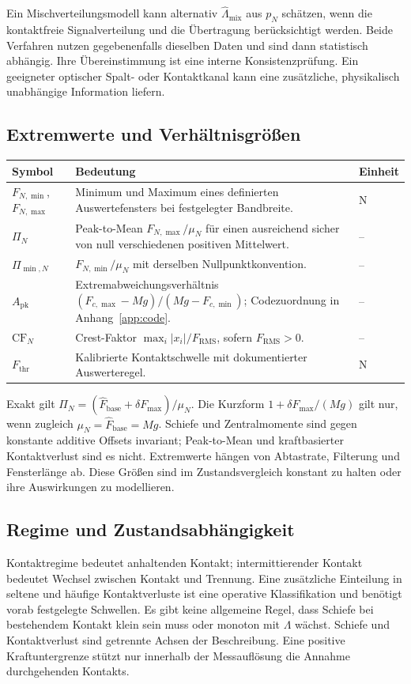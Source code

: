 \documentclass[11pt,a4paper]{article}
\makeatletter
\newenvironment{symtab}{\begin{longtable}{@{}L{.22\textwidth}L{.62\textwidth}L{.12\textwidth}@{}}\toprule\textbf{Symbol}&\textbf{Bedeutung}&\textbf{Einheit}\\\midrule\endhead}{\bottomrule\end{longtable}}
\makeatother
\begin{document}
Ein Mischverteilungsmodell kann alternativ $\hat\Lambda_{\mathrm{mix}}$ aus $p_N$ schätzen, wenn die kontaktfreie Signalverteilung und die Übertragung berücksichtigt werden. Beide Verfahren nutzen gegebenenfalls dieselben Daten und sind dann statistisch abhängig. Ihre Übereinstimmung ist eine interne Konsistenzprüfung. Ein geeigneter optischer Spalt- oder Kontaktkanal kann eine zusätzliche, physikalisch unabhängige Information liefern.

\subsection{Extremwerte und Verhältnisgrößen}
\begin{symtab}
$F_{N,\min}$, $F_{N,\max}$&Minimum und Maximum eines definierten Auswertefensters bei festgelegter Bandbreite.&N\\
$\Pi_N$&Peak-to-Mean $F_{N,\max}/\mu_N$ für einen ausreichend sicher von null verschiedenen positiven Mittelwert.&--\\
$\Pi_{\min,N}$&$F_{N,\min}/\mu_N$ mit derselben Nullpunktkonvention.&--\\
$A_{\mathrm{pk}}$&Extremabweichungsverhältnis $(F_{c,\max}-Mg)/(Mg-F_{c,\min})$; Codezuordnung in Anhang~\ref{app:code}.&--\\
$\mathrm{CF}_N$&Crest-Faktor $\max_i|x_i|/F_{\mathrm{RMS}}$, sofern $F_{\mathrm{RMS}}>0$.&--\\
$F_{\mathrm{thr}}$&Kalibrierte Kontaktschwelle mit dokumentierter Auswerteregel.&N\\
\end{symtab}
Exakt gilt $\Pi_N=(\hat F_{\mathrm{base}}+\delta F_{\max})/\mu_N$. Die Kurzform $1+\delta F_{\max}/(Mg)$ gilt nur, wenn zugleich $\mu_N=\hat F_{\mathrm{base}}=Mg$. Schiefe und Zentralmomente sind gegen konstante additive Offsets invariant; Peak-to-Mean und kraftbasierter Kontaktverlust sind es nicht. Extremwerte hängen von Abtastrate, Filterung und Fensterlänge ab. Diese Größen sind im Zustandsvergleich konstant zu halten oder ihre Auswirkungen zu modellieren.

\subsection{Regime und Zustandsabhängigkeit}
Kontaktregime bedeutet anhaltenden Kontakt; intermittierender Kontakt bedeutet Wechsel zwischen Kontakt und Trennung. Eine zusätzliche Einteilung in seltene und häufige Kontaktverluste ist eine operative Klassifikation und benötigt vorab festgelegte Schwellen.
Es gibt keine allgemeine Regel, dass Schiefe bei bestehendem Kontakt klein sein muss oder monoton mit $\Lambda$ wächst. Schiefe und Kontaktverlust sind getrennte Achsen der Beschreibung. Eine positive Kraftuntergrenze stützt nur innerhalb der Messauflösung die Annahme durchgehenden Kontakts.
\end{document}
